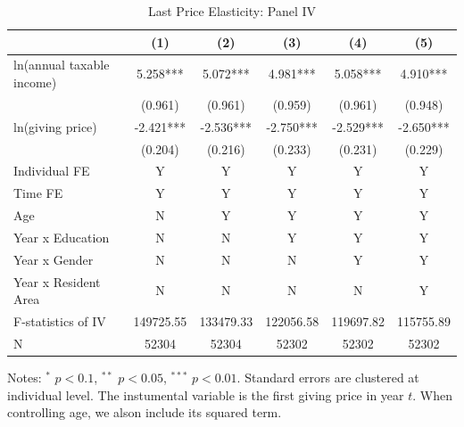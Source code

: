 \documentclass[ review  , 3p ]{elsarticle}
\begin{document}
  \begin{table}

  \caption{\label{tab:kableLastElasticity1}Last Price Elasticity: Panel IV}
  \centering
  \fontsize{7}{9}\selectfont
  \begin{threeparttable}
  \begin{tabular}[t]{lccccc}
  \toprule
   & (1) & (2) & (3) & (4) & (5)\\
  \midrule
  ln(annual taxable income) & 5.258*** & 5.072*** & 4.981*** & 5.058*** & 4.910***\\
   & (0.961) & (0.961) & (0.959) & (0.961) & (0.948)\\
  ln(giving price) & -2.421*** & -2.536*** & -2.750*** & -2.529*** & -2.650***\\
   & (0.204) & (0.216) & (0.233) & (0.231) & (0.229)\\
  Individual FE & Y & Y & Y & Y & Y\\
  Time FE & Y & Y & Y & Y & Y\\
  Age & N & Y & Y & Y & Y\\
  Year x Education & N & N & Y & Y & Y\\
  Year x Gender & N & N & N & Y & Y\\
  Year x Resident Area & N & N & N & N & Y\\
  F-statistics of IV & 149725.55 & 133479.33 & 122056.58 & 119697.82 & 115755.89\\
  N & 52304 & 52304 & 52302 & 52302 & 52302\\
  \bottomrule
  \end{tabular}
  \begin{tablenotes}
  \item Notes: $^{*}$ $p < 0.1$, $^{**}$ $p < 0.05$, $^{***}$ $p < 0.01$. Standard errors are clustered at individual level. The instumental variable is the first giving price in year $t$. When controlling age, we alson include its squared term.
  \end{tablenotes}
  \end{threeparttable}
  \end{table}
\end{document}
